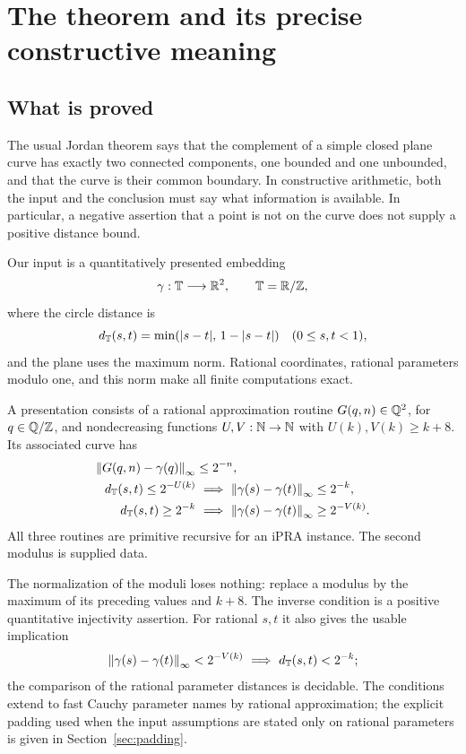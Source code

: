\section{The theorem and its precise constructive meaning}\label{sec:statement}

\subsection{What is proved}

The usual Jordan theorem says that the complement of a simple closed plane
curve has exactly two connected components, one bounded and one unbounded,
and that the curve is their common boundary. In constructive arithmetic,
both the input and the conclusion must say what information is available.
In particular, a negative assertion that a point is not on the curve does
not supply a positive distance bound.

Our input is a quantitatively presented embedding
\[
 \gamma:\mathbb T\longrightarrow\mathbb R^2,\qquad \mathbb T=\mathbb R/\mathbb Z,
\]
where the circle distance is
\[
 d_\mathbb T(s,t)=\min(|s-t|,\,1-|s-t|)
 \quad(0\le s,t<1),
\]
and the plane uses the maximum norm. Rational coordinates, rational
parameters modulo one, and this norm make all finite computations exact.

\begin{definition}\label{def:presentation}
A presentation consists of a rational approximation routine
$G(q,n)\in\mathbb Q^2$, for $q\in\mathbb Q/\mathbb Z$, and nondecreasing functions
$U,V:\mathbb N\to\mathbb N$ with $U(k),V(k)\ge k+8$. Its associated curve has
\begin{align}
 \left\lVert G(q,n)-\gamma(q)\right\rVert_\infty&\le 2^{-n},\label{eq:name}\\
 d_\mathbb T(s,t)\le 2^{-U(k)}
   &\ \Longrightarrow\
       \left\lVert \gamma(s)-\gamma(t)\right\rVert_\infty\le 2^{-k},\label{eq:forward}\\
 d_\mathbb T(s,t)\ge 2^{-k}
   &\ \Longrightarrow\
       \left\lVert \gamma(s)-\gamma(t)\right\rVert_\infty\ge 2^{-V(k)}.\label{eq:inverse}
\end{align}
All three routines are primitive recursive for an iPRA instance.
The second modulus is supplied data.
\end{definition}

The normalization of the moduli loses nothing: replace a modulus by the
maximum of its preceding values and $k+8$. The inverse condition is a
positive quantitative injectivity assertion. For rational $s,t$ it also
gives the usable implication
\[
 \left\lVert \gamma(s)-\gamma(t)\right\rVert_\infty<2^{-V(k)}
 \ \Longrightarrow\ d_\mathbb T(s,t)<2^{-k};
\]
the comparison of the rational parameter distances is decidable.
The conditions extend to fast Cauchy parameter names by rational
approximation; the explicit padding used when the input assumptions
are stated only on rational parameters is given in
Section~\ref{sec:padding}.

